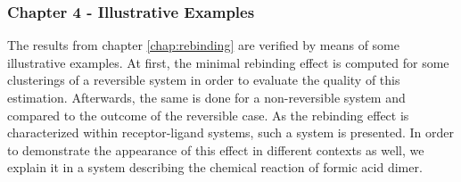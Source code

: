 \subsubsection*{Chapter 4 - Illustrative Examples}

The results from chapter \ref{chap:rebinding} are verified by means of some illustrative examples.
At first, the minimal rebinding effect is computed for some clusterings of a reversible system in order to evaluate the quality of this estimation.
Afterwards, the same is done for a non-reversible system and compared to the outcome of the reversible case.
As the rebinding effect is characterized within receptor-ligand systems, such a system is presented.
In order to demonstrate the appearance of this effect in different contexts as well, we explain it in a system describing the chemical reaction of formic acid dimer. %

